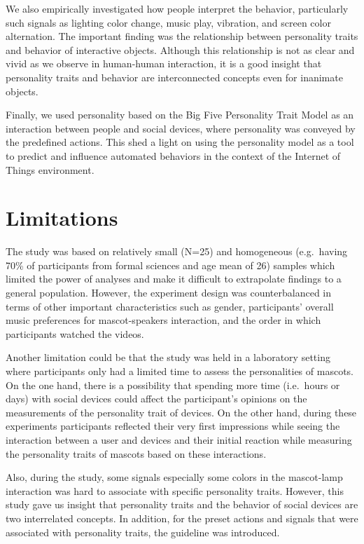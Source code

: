 We also empirically investigated how people interpret the behavior, particularly such
signals as lighting color change, music play, vibration, and screen color alternation.
The important finding was the relationship between personality traits and behavior of interactive objects.
Although this relationship is not as clear and vivid as we observe in human-human interaction,
it is a good insight that personality traits and behavior are interconnected concepts even for inanimate objects.

Finally, we used personality based on the Big Five Personality Trait Model as an interaction
between people and social devices, where personality was conveyed by the predefined actions.
This shed a light on using the personality model as a tool to predict and influence automated behaviors
in the context of the Internet of Things environment.

\section{Limitations}
\label{sec:limitations}
The study was based on relatively small (N=25) and homogeneous
(e.g.\ having 70\% of participants from formal sciences and age mean of 26) samples which
limited the power of analyses and make it difficult to extrapolate findings to a general population.
However, the experiment design was counterbalanced in terms of other important
characteristics such as gender, participants’ overall music preferences for mascot-speakers
interaction, and the order in which participants watched the videos.

Another limitation could be that the study was held in a laboratory setting where
participants only had a limited time to assess the personalities of mascots.
On the one hand, there is a possibility that spending more time (i.e.\ hours or days)
with social devices could affect the participant’s opinions on the measurements of the personality trait of devices.
On the other hand, during these experiments participants reflected their very first impressions
while seeing the interaction between a user and devices and their initial reaction while measuring the
personality traits of mascots based on these interactions.

Also, during the study, some signals especially some colors in the mascot-lamp interaction was
hard to associate with specific personality traits.
However, this study gave us insight that personality traits and the behavior
of social devices are two interrelated concepts.
In addition, for the preset actions and signals that were associated with personality traits,
the guideline was introduced.

